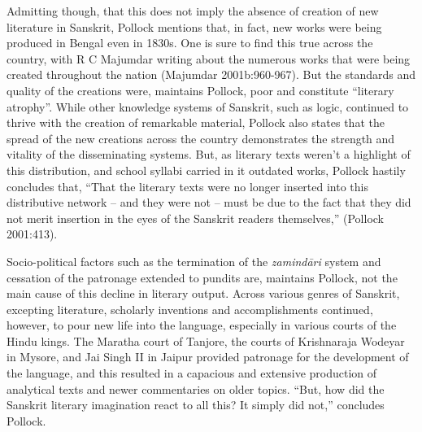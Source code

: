 Admitting though, that this does not imply the absence of creation of new literature in Sanskrit, Pollock mentions that, in fact, new works were being produced in Bengal even in 1830s. One is sure to find this true across the country, with R C Majumdar writing about the numerous works that were being created throughout the nation (Majumdar 2001b:960-967). But the standards and quality of the creations were, maintains Pollock, poor and constitute “literary atrophy”. While other knowledge systems of Sanskrit, such as logic, continued to thrive with the creation of remarkable material, Pollock also states that the spread of the new creations across the country demonstrates the strength and vitality of the disseminating systems. But, as literary texts  weren’t a highlight of this distribution, and school syllabi carried in it outdated works, Pollock hastily concludes that, “That the literary texts were no longer inserted into this distributive network – and they were not – must be due to the fact that they did not merit insertion in the eyes of the Sanskrit readers themselves,” (Pollock 2001:413).

Socio-political factors such as the termination of the {\sl zamindāri} system and cessation of the patronage extended to pundits are, maintains Pollock, not the main cause of this decline in literary output. Across various genres of Sanskrit, excepting literature, scholarly inventions and accomplishments continued, however, to pour new life into the language, especially in various courts of the Hindu kings. The Maratha court of Tanjore, the courts of Krishnaraja Wodeyar in Mysore, and Jai Singh II in Jaipur provided patronage for the development of the language, and this resulted in a capacious and extensive production of analytical texts and newer commentaries on older topics. “But, how did the Sanskrit literary imagination react to all this? It simply did not,” concludes Pollock.  

